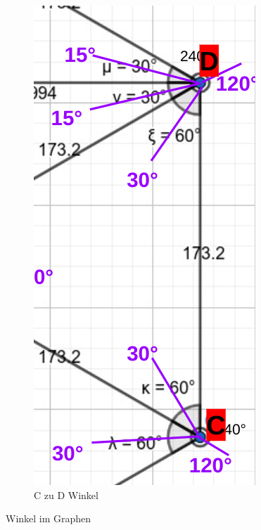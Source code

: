 \begin{figure}[H]
\begin{subfigure}{0.32\textwidth}
\includegraphics[width=0.95\linewidth]{assets/informatik-prototyp/c-d-angle-labeled.png} 
\caption{C zu D Winkel}
\label{fig:excerpt-angled-graph}
\end{subfigure}
\caption{Winkel im Graphen}
\label{fig:angles}
\end{figure}

